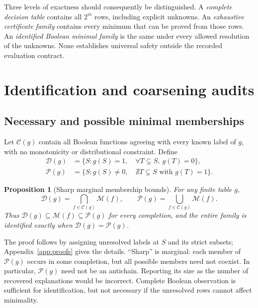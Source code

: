 \documentclass{article}
\newtheorem{proposition}{Proposition}
\newcommand{\Fam}{\mathcal{M}}
\newcommand{\Nec}{\mathcal{D}}
\newcommand{\Poss}{\mathcal{P}}
\newcommand{\Completions}{\mathcal{C}}
\begin{document}
Three levels of exactness should consequently be distinguished. A
\emph{complete decision table} contains all $2^m$ rows, including explicit
unknowns. An \emph{exhaustive certificate family} contains every minimum that
can be proved from those rows. An \emph{identified Boolean minimal family}
is the same under every allowed resolution of the unknowns. None establishes
universal safety outside the recorded evaluation contract.

\section{Identification and coarsening audits}

\subsection{Necessary and possible minimal memberships}

Let $\Completions(g)$ contain all Boolean functions agreeing with every known
label of $g$, with no monotonicity or distributional constraint. Define
\begin{align}
\Nec(g)&=\{S:g(S)=1,\quad \forall T\subsetneq S,\ g(T)=0\},
\label{eq:necessary}\\
\Poss(g)&=\{S:g(S)\ne0,\quad
                   \nexists T\subsetneq S\text{ with }g(T)=1\}.
\label{eq:possible}
\end{align}

\begin{proposition}[Sharp marginal membership bounds]
\label{prop:bounds}
For any finite table $g$,
\begin{equation}
\Nec(g)=\bigcap_{f\in\Completions(g)}\Fam(f),\qquad
\Poss(g)=\bigcup_{f\in\Completions(g)}\Fam(f).
\label{eq:bounds}
\end{equation}
Thus $\Nec(g)\subseteq\Fam(f)\subseteq\Poss(g)$ for every completion, and
the entire family is identified exactly when $\Nec(g)=\Poss(g)$.
\end{proposition}

The proof follows by assigning unresolved labels at $S$ and its strict
subsets; Appendix~\ref{app:proofs} gives the details. ``Sharp'' is marginal:
each member of $\Poss(g)$ occurs in some completion, but all possible members
need not coexist. In particular, $\Poss(g)$ need not be an antichain. Reporting
its size as the number of recovered explanations would be incorrect.
Complete Boolean observation is sufficient for identification, but not
necessary if the unresolved rows cannot affect minimality.
\end{document}
